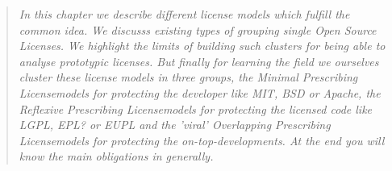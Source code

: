 %
%
%
%
%


\footnotesize
\begin{quote}\itshape
In this chapter we describe different license models which fulfill the common
idea. We discusss existing types of grouping single Open Source Licenses. We
highlight the limits of building such clusters for being able to analyse
prototypic licenses. But finally for learning the field we ourselves cluster
these license models in three groups, the \textit{Minimal Prescribing
Licensemodels} for \textit{protecting the developer} like MIT, BSD or Apache,
the \textit{Reflexive Prescribing Licensemodels } for \textit{protecting the
licensed code} like LGPL, EPL? or EUPL and the 'viral' \textit{Overlapping
Prescribing Licensemodels} for \textit{protecting the on-top-developments}. At
the end you will know the main obligations in generally.
\end{quote}
\normalsize{}

